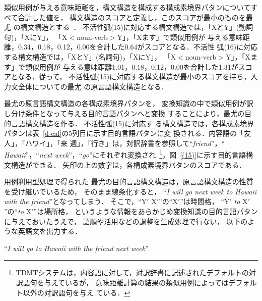 類似用例が与える意味距離を，構文構造を構成する構成素境界パタンについてすべて合計した値を，
構文構造のスコアと定義し，このスコアが最小のものを最尤
の構文構造とする~\cite{Furuse}．
不活性弧(15)に対応する構文構造では，「XとY」(動詞句)，「XにY」，
「X{\footnotesize $<$}noun-verb{\footnotesize $>$}Y」，「Xます」で類似用例が
与える意味距離，0.34，0.18，0.12，0.00を合計した0.64がスコアとなる．不活性
弧(16)に対応する構文構造では，「XとY」(名詞句)，「XにY」，
「X{\footnotesize $<$}noun-verb{\footnotesize $>$}Y」，「Xます」で類似用例が
与える意味距離1.01，0.18，0.12，0.00を合計した1.31がスコアとなる．従って，
不活性弧(15)に対応する構文構造が最小のスコアを持ち，入力文全体についての最尤
の原言語構文構造となる．
\clearpage

最尤の原言語構文構造の各構成素境界パタンを，
変換知識の中で類似用例が訳し分け条件となって与える目的言語パタンへと変換
することにより，最尤の目的言語構文構造を作る．
不活性弧(15)に対応す
る構文構造では，各構成素境界パタンは表~\ref{d-cal}の5列目に示す目的言語パタンに変
換される．内容語の「友人」，「ハワイ」，「来
週」，「行き」は，対訳辞書を参照して``{\it friend}''，``{\it
Hawaii}''，``{\it next week}''，``{\it go}''にそれぞれ変換され~\footnote
{TDMTシステムは，内容語に対して，対訳辞書に記述されたデフォルトの対訳語句を与えているが，
意味距離計算の結果の類似用例によってはデフォルト以外の対訳語句を与え
ている\cite{Furuse,Yamada}．}，図~\ref{(15)}に示す目的言語構文構造ができる．
矢印の上の数字は，各構成素境界パタンのスコアである．

\begin{figure*}[htb]
\begin{center}
\caption{最尤原言語構文構造の変換}
\label{(15)}
\end{center}
\end{figure*}

用例利用型処理で得られた
最尤の目的言語構文構造は，原言語構文構造の性質を受け継いでいるため，
そのまま線条化すると，
``{\it I will go next week to Hawaii with the friend}''となってしまう．
そこで，``Y$'$ X$'$''の``X$'$''は時間格，
``Y$'$ {\it to} X$'$''の``{\it to} X$'$''は場所格，
というような情報をあらかじめ変換知識の目的言語パタンに与えておいたうえで，
語順や活用などの調整を生成処理で行ない，
以下のような英語文を出力する．

\begin{small}
\begin{center}
``{\it I will go to Hawaii with the friend next week}''
\end{center}
\end{small}

